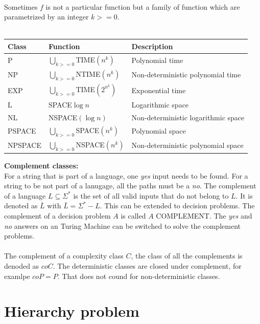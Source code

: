 \documentclass[a4]{scrartcl}
\begin{document}
\ \\
Sometimes $f$ is not a particular function but a family of function which are parametrized by an integer $k>=0$. 
\ \\ \\
\begin{tabular}{lll}
Class & Function & Description \\
\hline
P & $\bigcup_{k >= 0} $TIME$(n^k)$ & Polynomial time \\
NP&$\bigcup_{k >= 0} $NTIME$(n^k)$ & Non-deterministic polynomial time \\
  EXP & $\bigcup_{k >= 0} $TIME$(2^{n^k})$ & Exponential time \\
   \hline
   L & SPACE$\log n$ & Logarithmic space \\
    NL &  NSPACE$(\log n)$ & Non-deterministic logarithmic space \\
     PSPACE & $\bigcup_{k >= 0} $SPACE$(n^k)$ & Polynomial space \\
      NPSPACE & $\bigcup_{k >= 0} $NSPACE$(n^k)$ & Non-deterministic polynomial space\\
      \hline
\end{tabular}


\newpage
\textbf{Complement classes:} \cite{book, CC} \\

For a string that is part of a language, one \textit{yes} input needs to be found. For a string to be not part of a lanugage, all the paths must be a \textit{no}.
The complement of a language $L \subseteq \Sigma^*$ is the set of all valid inputs that do not belong to $L$. It is denoted as $\bar{L}$ with $\bar{L} = \Sigma^* - L$.
This can be extended to decision problems. The complement of a decision problem $A$ is called $A$ COMPLEMENT.
The \textit{yes} and \textit{no} answers on an Turing Machine can be switched to solve the complement problems.
\ \\
\\
The complement of a complexity class $C$, the class of all the complements is denoded as $coC$. The deterministic classes are closed under complement, for examlpe $coP = P$. That does not cound for non-deterministic classes.





\section*{Hierarchy problem}



\newpage

\printbibliography
\end{document}
